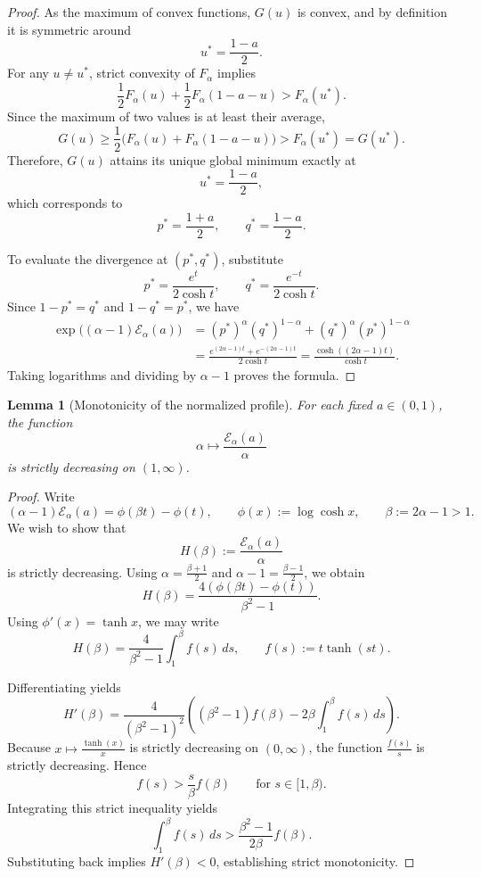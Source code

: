 \documentclass[10pt]{article}
\newtheorem{lemma}[theorem]{Lemma}
\begin{document}
\begin{proof}
As the maximum of convex functions, $G(u)$ is convex, and by definition it is symmetric around
\[
u^*=\frac{1-a}{2}.
\]
For any $u\neq u^*$, strict convexity of $F_\alpha$ implies
\[
\frac{1}{2}F_\alpha(u)+\frac{1}{2}F_\alpha(1-a-u)>F_\alpha(u^*).
\]
Since the maximum of two values is at least their average,
\[
G(u)\ge
\frac{1}{2}\big(F_\alpha(u)+F_\alpha(1-a-u)\big)
>
F_\alpha(u^*)
=
G(u^*).
\]
Therefore, $G(u)$ attains its unique global minimum exactly at
\[
u^*=\frac{1-a}{2},
\]
which corresponds to
\[
p^*=\frac{1+a}{2},
\qquad
q^*=\frac{1-a}{2}.
\]

To evaluate the divergence at $(p^*,q^*)$, substitute
\[
p^*=\frac{e^t}{2\cosh t},
\qquad
q^*=\frac{e^{-t}}{2\cosh t}.
\]
Since $1-p^*=q^*$ and $1-q^*=p^*$, we have
\begin{align*}
\exp\!\big((\alpha-1)\mathcal E_\alpha(a)\big)
&=
(p^*)^\alpha(q^*)^{1-\alpha}
+
(q^*)^\alpha(p^*)^{1-\alpha} \\
&=
\frac{e^{(2\alpha-1)t}+e^{-(2\alpha-1)t}}{2\cosh t}
=
\frac{\cosh((2\alpha-1)t)}{\cosh t}.
\end{align*}
Taking logarithms and dividing by $\alpha-1$ proves the formula.
\end{proof}

\begin{lemma}[Monotonicity of the normalized profile]
\label{lem:normalized-monotone}
For each fixed $a\in(0,1)$, the function
\[
\alpha \longmapsto \frac{\mathcal E_\alpha(a)}{\alpha}
\]
is strictly decreasing on $(1,\infty)$.
\end{lemma}

\begin{proof}
Write
\[
(\alpha-1)\mathcal E_\alpha(a)=\phi(\beta t)-\phi(t),
\qquad
\phi(x):=\log\cosh x,
\qquad
\beta:=2\alpha-1>1.
\]
We wish to show that
\[
H(\beta):=\frac{\mathcal E_\alpha(a)}{\alpha}
\]
is strictly decreasing. Using $\alpha=\frac{\beta+1}{2}$ and $\alpha-1=\frac{\beta-1}{2}$, we obtain
\[
H(\beta)=\frac{4(\phi(\beta t)-\phi(t))}{\beta^2-1}.
\]
Using $\phi'(x)=\tanh x$, we may write
\[
H(\beta)=\frac{4}{\beta^2-1}\int_1^\beta f(s)\,ds,
\qquad
f(s):=t\tanh(st).
\]

Differentiating yields
\[
H'(\beta)
=
\frac{4}{(\beta^2-1)^2}
\left(
(\beta^2-1)f(\beta)-2\beta\int_1^\beta f(s)\,ds
\right).
\]
Because $x\mapsto \frac{\tanh(x)}{x}$ is strictly decreasing on $(0,\infty)$, the function $\frac{f(s)}{s}$ is strictly decreasing. Hence
\[
f(s)>\frac{s}{\beta}f(\beta)
\qquad\text{for }s\in[1,\beta).
\]
Integrating this strict inequality yields
\[
\int_1^\beta f(s)\,ds
>
\frac{\beta^2-1}{2\beta}f(\beta).
\]
Substituting back implies $H'(\beta)<0$, establishing strict monotonicity.
\end{proof}
\end{document}
